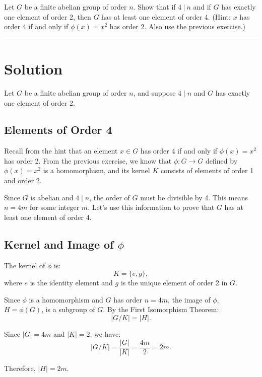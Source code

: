 \documentclass[12pt]{amsart}
\theoremstyle{definition}
\numberwithin{equation}{section}
\begin{document}
\begin{exercise}{6} Let $G$ be a finite abelian group of order $n$. Show that if \(4 \ | \ n\) and if $G$ has exactly one element of order 2, then $G$ has at least one element of order 4. (Hint: $x$ has order 4 if and only if \(\phi(x)=x^2\) has order 2. Also use the previous exercise.)
    
    \noindent\rule{\linewidth}{1pt}
    
    \section*{Solution}

    Let \(G\) be a finite abelian group of order \(n\), and suppose \(4 \mid n\) and \(G\) has exactly one element of order 2.
    
    \subsection*{Elements of Order 4}
    
    Recall from the hint that an element \(x \in G\) has order 4 if and only if \(\phi(x) = x^2\) has order 2. From the previous exercise, we know that \(\phi: G \rightarrow G\) defined by \(\phi(x) = x^2\) is a homomorphism, and its kernel \(K\) consists of elements of order 1 and order 2.
    
    Since \(G\) is abelian and \(4 \mid n\), the order of \(G\) must be divisible by 4. This means \(n = 4m\) for some integer \(m\). Let's use this information to prove that \(G\) has at least one element of order 4.
    
    \subsection*{Kernel and Image of \(\phi\)}
    
    The kernel of \(\phi\) is:
    \[
    K = \{e, g\},
    \]
    where \(e\) is the identity element and \(g\) is the unique element of order 2 in \(G\).
    
    Since \(\phi\) is a homomorphism and \(G\) has order \(n = 4m\), the image of \(\phi\), \(H = \phi(G)\), is a subgroup of \(G\). By the First Isomorphism Theorem:
    \[
    |G/K| = |H|.
    \]
    
    Since \(|G| = 4m\) and \(|K| = 2\), we have:
    \[
    |G/K| = \frac{|G|}{|K|} = \frac{4m}{2} = 2m.
    \]
    
    Therefore, \(|H| = 2m\).
    

\end{exercise}
\end{document}
